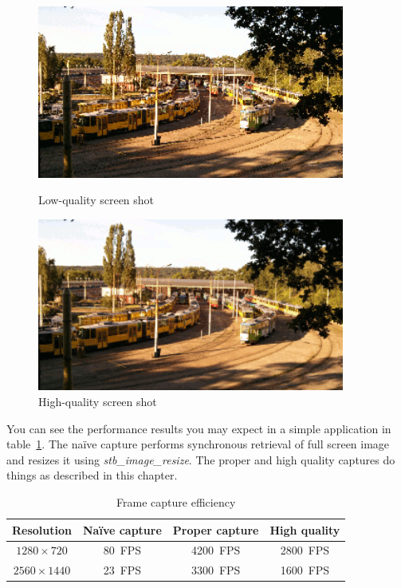 \documentclass[hidelinks,titlepage,a4paper]{article}
\begin{document}
\begin{figure}[h]
\centering
\begin{minipage}{0.45\textwidth}
\centering
\includegraphics[width=0.9\textwidth]{images/screenshot-lo.png}
\caption{Low-quality screen shot}
\label{lowqualityss}
\end{minipage}\hfill
\begin{minipage}{0.45\textwidth}
\centering
\includegraphics[width=0.9\textwidth]{images/screenshot-hi.png}
\caption{High-quality screen shot}
\label{highqualityss}
\end{minipage}
\end{figure}

You can see the performance results you may expect in a simple application in table~\ref{asynccapture}. The na\"ive capture performs synchronous retrieval of full screen image and resizes it using \emph{stb\_image\_resize}. The proper and high quality captures do things as described in this chapter.

\begin{table}[h]
\centering
\begin{tabular}[h]{c|c|c|c}
\textbf{Resolution} & \textbf{Na\"ive capture} & \textbf{Proper capture} & \textbf{High quality} \\ \hline
$1280\times720$ & 80~FPS & 4200~FPS & 2800~FPS \\
$2560\times1440$ & 23~FPS & 3300~FPS & 1600~FPS
\end{tabular}
\caption{Frame capture efficiency}
\label{asynccapture}
\end{table}
\end{document}
